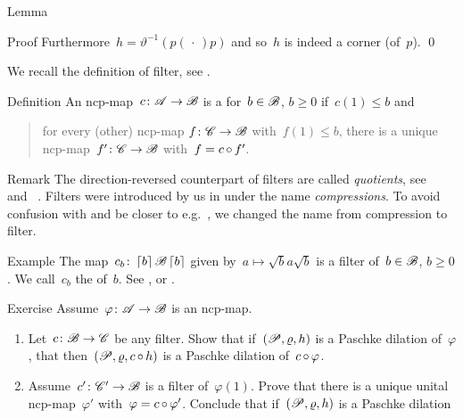 \documentclass[b]{subfiles}
\begin{document}
\begin{parsec}
\begin{point}{Lemma}
\begin{point}{Proof}
    Furthermore~$h = \vartheta^{-1}(p (\,\cdot\,) p)$
     and so~$h$ is indeed a corner (of~$p$). \qed
\end{point}
\end{point}
\begin{point}%
We recall the definition of filter, see . 
\end{point}
\begin{point}{Definition}%
An ncp-map~$c \colon \mathscr{A} \to \mathscr{B}$
    is a  for~$b \in\mathscr{B}$, $b \geq 0$ if~$c(1)\leq b$
    and
    \begin{quote}
        for every (other) ncp-map $f\colon \mathscr{C} \to \mathscr{B}$
            with~$f(1) \leq b$,
            there is a unique ncp-map~$f'\colon \mathscr{C} \to \mathscr{B}$
            with~$f = c \mathop{\circ} f'$.
    \end{quote}
\begin{point}{Remark}%
The direction-reversed counterpart
    of filters are called \emph{quotients},
    see~ and~\cite{effintro} .
Filters were introduced by us in \cite[Dfn.~2]{westerbaan2016universal}
    under the name \emph{compressions}.
To avoid confusion with \cite{alfsen2012}
    and be closer to e.g.~\cite{wilce2016royal},
    we changed the name from compression to filter.
\end{point}
\end{point}
\begin{point}{Example}%
    The map~$c_b\colon \left\lceil b\right\rceil \mathscr{B} \left\lceil b\right\rceil$
        given by~$a \mapsto \sqrt{b} a \sqrt{b}$ is a filter
        of~$b\in \mathscr{B}$, $b\geq 0$.
    We call~$c_b$ the  of~$b$.
    See , 
        or \cite[Prop.~6]{westerbaan2016universal}.
\end{point}
\begin{point}{Exercise}%
Assume~$\varphi\colon \mathscr{A} \to \mathscr{B}$ is an ncp-map.
\begin{enumerate}
\item
    Let~$c \colon \mathscr{B} \to \mathscr{C}$ be any filter.
    Show that if~$(\mathscr{P}, \varrho, h)$ is a Paschke dilation
            of~$\varphi$,
    that then~$(\mathscr{P}, \varrho, c \mathop{\circ} h)$ is a Paschke dilation
        of~$c \mathop{\circ} \varphi$.
\item
    Assume~$c'\colon \mathscr{C}' \to \mathscr{B}$ is a filter of~$\varphi(1)$.
    Prove that there is a unique unital ncp-map~$\varphi'$
        with~$\varphi = c \mathop{\circ} \varphi'$.
    Conclude that if~$(\mathscr{P}, \varrho, h)$ is a Paschke dilation

\end{enumerate}
\end{point}
\end{parsec}
\end{document}
